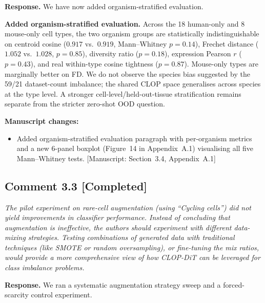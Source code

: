 \documentclass[11pt,letterpaper]{article}
\newcommand{\statuscompleted}{\textcolor{statusgreen}{\textbf{[Completed]}}}
\newcommand{\msref}[1]{\textcolor{blue!60!black}{\textsf{[Manuscript: #1]}}}
\begin{document}
\noindent\textbf{Response.}
We have now added organism-stratified evaluation.

\begin{revisionupdate}
\textbf{Added organism-stratified evaluation.}
Across the 18 human-only and 8 mouse-only cell types, the two organism groups are statistically indistinguishable on centroid cosine ($0.917$ vs.\ $0.919$, Mann--Whitney $p = 0.14$), Frechet distance ($1.052$ vs.\ $1.028$, $p = 0.85$), diversity ratio ($p = 0.18$), expression Pearson $r$ ($p = 0.43$), and real within-type cosine tightness ($p = 0.87$). Mouse-only types are marginally better on FD. We do not observe the species bias suggested by the 59/21 dataset-count imbalance; the shared CLOP space generalises across species at the type level. A stronger cell-level/held-out-tissue stratification remains separate from the stricter zero-shot OOD question.
\end{revisionupdate}

\noindent\textbf{Manuscript changes:}
\begin{itemize}
  \item Added organism-stratified evaluation paragraph with per-organism metrics and a new 6-panel boxplot (Figure~14 in Appendix~A.1) visualising all five Mann--Whitney tests. \msref{Section~3.4, Appendix~A.1}
\end{itemize}

\medskip

\subsection*{Comment 3.3 \hfill \statuscompleted}

\begin{reviewercomment}
\itshape
The pilot experiment on rare-cell augmentation (using ``Cycling cells'') did not yield improvements in classifier performance. Instead of concluding that augmentation is ineffective, the authors should experiment with different data-mixing strategies. Testing combinations of generated data with traditional techniques (like SMOTE or random oversampling), or fine-tuning the mix ratios, would provide a more comprehensive view of how CLOP-DiT can be leveraged for class imbalance problems.
\end{reviewercomment}

\noindent\textbf{Response.}
We ran a systematic augmentation strategy sweep and a forced-scarcity control experiment.
\end{document}
